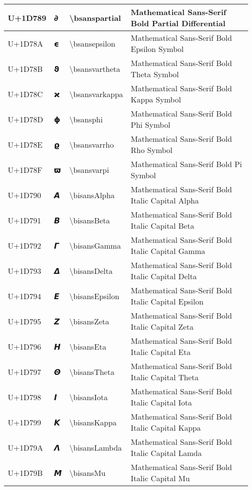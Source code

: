 \begin{table}[h]
\begin{tabulary}{\linewidth}{|L|L|L|L|}
\hline
U+1D789 & 𝞉 & {\textbackslash}bsanspartial & Mathematical Sans-Serif Bold Partial Differential \\
\hline
U+1D78A & 𝞊 & {\textbackslash}bsansepsilon & Mathematical Sans-Serif Bold Epsilon Symbol \\
\hline
U+1D78B & 𝞋 & {\textbackslash}bsansvartheta & Mathematical Sans-Serif Bold Theta Symbol \\
\hline
U+1D78C & 𝞌 & {\textbackslash}bsansvarkappa & Mathematical Sans-Serif Bold Kappa Symbol \\
\hline
U+1D78D & 𝞍 & {\textbackslash}bsansphi & Mathematical Sans-Serif Bold Phi Symbol \\
\hline
U+1D78E & 𝞎 & {\textbackslash}bsansvarrho & Mathematical Sans-Serif Bold Rho Symbol \\
\hline
U+1D78F & 𝞏 & {\textbackslash}bsansvarpi & Mathematical Sans-Serif Bold Pi Symbol \\
\hline
U+1D790 & 𝞐 & {\textbackslash}bisansAlpha & Mathematical Sans-Serif Bold Italic Capital Alpha \\
\hline
U+1D791 & 𝞑 & {\textbackslash}bisansBeta & Mathematical Sans-Serif Bold Italic Capital Beta \\
\hline
U+1D792 & 𝞒 & {\textbackslash}bisansGamma & Mathematical Sans-Serif Bold Italic Capital Gamma \\
\hline
U+1D793 & 𝞓 & {\textbackslash}bisansDelta & Mathematical Sans-Serif Bold Italic Capital Delta \\
\hline
U+1D794 & 𝞔 & {\textbackslash}bisansEpsilon & Mathematical Sans-Serif Bold Italic Capital Epsilon \\
\hline
U+1D795 & 𝞕 & {\textbackslash}bisansZeta & Mathematical Sans-Serif Bold Italic Capital Zeta \\
\hline
U+1D796 & 𝞖 & {\textbackslash}bisansEta & Mathematical Sans-Serif Bold Italic Capital Eta \\
\hline
U+1D797 & 𝞗 & {\textbackslash}bisansTheta & Mathematical Sans-Serif Bold Italic Capital Theta \\
\hline
U+1D798 & 𝞘 & {\textbackslash}bisansIota & Mathematical Sans-Serif Bold Italic Capital Iota \\
\hline
U+1D799 & 𝞙 & {\textbackslash}bisansKappa & Mathematical Sans-Serif Bold Italic Capital Kappa \\
\hline
U+1D79A & 𝞚 & {\textbackslash}bisansLambda & Mathematical Sans-Serif Bold Italic Capital Lamda \\
\hline
U+1D79B & 𝞛 & {\textbackslash}bisansMu & Mathematical Sans-Serif Bold Italic Capital Mu \\

\end{tabulary}
\end{table}
